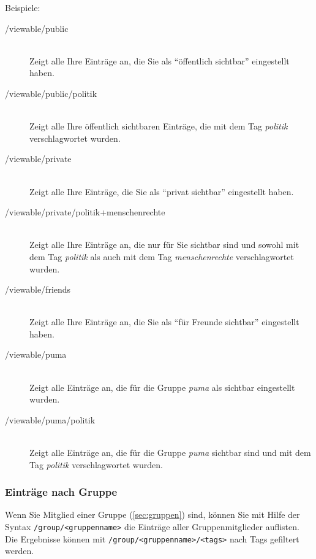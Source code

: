 Beispiele:
\begin{description}
    \item [/viewable/public] \hfill \\
    Zeigt alle Ihre Einträge an, die Sie als \enquote{öffentlich sichtbar} eingestellt haben.
    \item [/viewable/public/politik] \hfill \\
    Zeigt alle Ihre öffentlich sichtbaren Einträge, die mit dem Tag \textit{politik} verschlagwortet wurden.
    \item [/viewable/private] \hfill \\
    Zeigt alle Ihre Einträge, die Sie als \enquote{privat sichtbar} eingestellt haben.
    \item [/viewable/private/politik+menschenrechte] \hfill \\
    Zeigt alle Ihre Einträge an, die nur für Sie sichtbar sind und sowohl mit dem Tag \textit{politik} als auch mit dem Tag \textit{menschenrechte} verschlagwortet wurden. 
    \item [/viewable/friends] \hfill \\
    Zeigt alle Ihre Einträge an, die Sie als \enquote{für Freunde sichtbar} eingestellt haben.
    \item [/viewable/puma] \hfill \\
    Zeigt alle Einträge an, die für die Gruppe \textit{puma} als sichtbar eingestellt wurden.
    \item [/viewable/puma/politik] \hfill \\
    Zeigt alle Einträge an, die für die Gruppe \textit{puma} sichtbar sind und mit dem Tag \textit{politik} verschlagwortet wurden.
\end{description}

\subsubsection{Einträge nach Gruppe}
\label{sss:nachGruppe}
Wenn Sie Mitglied einer Gruppe (\autoref{sec:gruppen}) sind, können Sie mit Hilfe der Syntax \texttt{/group/<gruppenname>} die Einträge aller Gruppenmitglieder auflisten. Die Ergebnisse können mit \texttt{/group/<gruppenname>/<tags>} nach Tags gefiltert werden.

